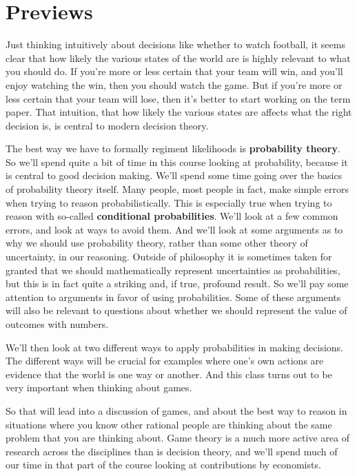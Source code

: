 \section{Previews}
Just thinking intuitively about decisions like whether to watch football, it seems clear that how likely the various states of the world are is highly relevant to what you should do. If you're more or less certain that your team will win, and you'll enjoy watching the win, then you should watch the game. But if you're more or less certain that your team will lose, then it's better to start working on the term paper. That intuition, that how likely the various states are affects what the right decision is, is central to modern decision theory.

The best way we have to formally regiment likelihoods is \textbf{probability theory}. So we'll spend quite a bit of time in this course looking at probability, because it is central to good decision making. We'll spend some time going over the basics of probability theory itself. Many people, most people in fact, make simple errors when trying to reason probabilistically. This is especially true when trying to reason with so-called \textbf{conditional probabilities}. We'll look at a few common errors, and look at ways to avoid them. And we'll look at some arguments as to why we should use probability theory, rather than some other theory of uncertainty, in our reasoning. Outside of philosophy it is sometimes taken for granted that we should mathematically represent uncertainties as probabilities, but this is in fact quite a striking and, if true, profound result. So we'll pay some attention to arguments in favor of using probabilities. Some of these arguments will also be relevant to questions about whether we should represent the value of outcomes with numbers.

We'll then look at two different ways to apply probabilities in making decisions. The different ways will be crucial for examples where one's own actions are evidence that the world is one way or another. And this class turns out to be very important when thinking about games.

So that will lead into a discussion of games, and about the best way to reason in situations where you know other rational people are thinking about the same problem that you are thinking about. Game theory is a much more active area of research across the disciplines than is decision theory, and we'll spend much of our time in that part of the course looking at contributions by economists.

